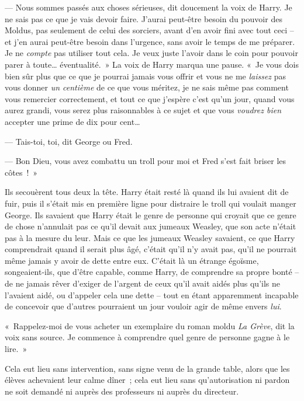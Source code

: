 --- Nous sommes passés aux choses sérieuses, dit doucement la voix de Harry.
Je ne sais pas ce que je vais devoir faire.
J'aurai peut-être besoin du pouvoir des Moldus, pas seulement de celui des sorciers, avant d'en avoir fini avec tout ceci -- et j'en aurai peut-être besoin dans l'urgence, sans avoir le temps de me préparer.
Je ne \emph{compte} pas utiliser tout cela.
Je veux juste l'avoir dans le coin pour pouvoir parer à toute… éventualité.~»
La voix de Harry marqua une pause.
«~Je vous dois bien sûr plus que ce que je pourrai jamais vous offrir et vous ne me \emph{laissez} pas vous donner \emph{un centième} de ce que vous méritez, je ne sais même pas comment vous remercier correctement, et tout ce que j'espère c'est qu'un jour, quand vous aurez grandi, vous serez plus raisonnables à ce sujet et que vous \emph{voudrez bien} accepter une prime de dix pour cent…

--- Tais-toi, toi, dit George ou Fred.

--- Bon Dieu, vous avez combattu un troll pour moi et Fred s'est fait briser les côtes~!~»

Ils secouèrent tous deux la tête.
Harry était resté là quand ils lui avaient dit de fuir, puis il s'était mis en première ligne pour distraire le troll qui voulait manger George.
Ils savaient que Harry était le genre de personne qui croyait que ce genre de chose n'annulait pas ce qu'il devait aux jumeaux Weasley, que son acte n'était pas à la mesure du leur.
Mais ce que les jumeaux Weasley savaient, ce que Harry comprendrait quand il serait plus âgé, c'était qu'il n'y avait pas, qu'il ne pourrait même jamais y avoir de dette entre eux.
C'était là un étrange égoïsme, songeaient-ils, que d'être capable, comme Harry, de comprendre sa propre bonté -- de ne jamais rêver d'exiger de l'argent de ceux qu'il avait aidés plus qu'ils ne l'avaient aidé, ou d'appeler cela une dette -- tout en étant apparemment incapable de concevoir que d'autres pourraient un jour vouloir agir de même envers \emph{lui}.

«~Rappelez-moi de vous acheter un exemplaire du roman moldu \emph{La Grève}, dit la voix sans source.
Je commence à comprendre quel genre de personne gagne à le lire.~»


Cela eut lieu sans intervention, sans signe venu de la grande table, alors que les élèves achevaient leur calme dîner~; cela eut lieu sans qu'autorisation ni pardon ne soit demandé ni auprès des professeurs ni auprès du directeur.

